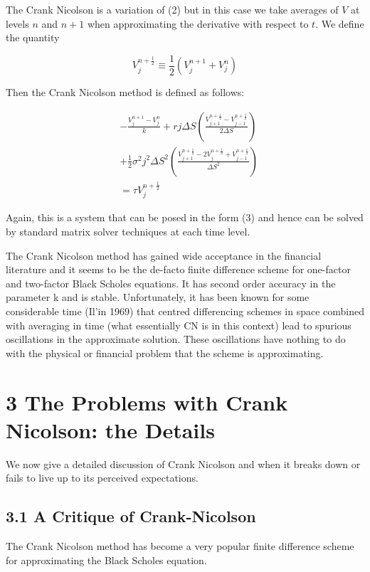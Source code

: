\documentclass[10pt]{article}
\begin{document}
The Crank Nicolson is a variation of (2) but in this case we take averages of $V$ at levels $n$ and $n+1$ when approximating the derivative with respect to $t$. We define the quantity


\begin{equation*}
V_{j}^{n+\frac{1}{2}} \equiv \frac{1}{2}\left(V_{j}^{n+1}+V_{j}^{n}\right) \tag{4}
\end{equation*}


Then the Crank Nicolson method is defined as follows:


\begin{align*}
& -\frac{V_{j}^{n+1}-V_{j}^{n}}{k}+r j \Delta S\left(\frac{V_{j+1}^{n+\frac{1}{2}}-V_{j-1}^{n+\frac{1}{2}}}{2 \Delta S}\right) \\
& +\frac{1}{2} \sigma^{2} j^{2} \Delta S^{2}\left(\frac{V_{j+1}^{n+\frac{1}{2}}-2 V_{j}^{n+\frac{1}{2}}+V_{j-1}^{n+\frac{1}{2}}}{\Delta S^{2}}\right)  \tag{5}\\
& =\tau V_{j}^{n+\frac{1}{2}}
\end{align*}


Again, this is a system that can be posed in the form (3) and hence can be solved by standard matrix solver techniques at each time level.

The Crank Nicolson method has gained wide acceptance in the financial literature and it seems to be the de-facto finite difference scheme for one-factor and two-factor Black Scholes equations. It has second order accuracy in the parameter k and is stable. Unfortunately, it has been known for some considerable time (Il'in 1969) that centred differencing schemes in space combined with averaging in time (what essentially CN is in this context) lead to spurious oscillations in the approximate solution. These oscillations have nothing to do with the physical or financial problem that the scheme is approximating.

\section*{3 The Problems with Crank Nicolson: the Details}
We now give a detailed discussion of Crank Nicolson and when it breaks down or fails to live up to its perceived expectations.

\subsection*{3.1 A Critique of Crank-Nicolson}
The Crank Nicolson method has become a very popular finite difference scheme for approximating the Black Scholes equation.
\end{document}
